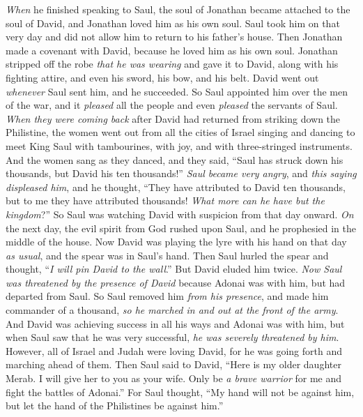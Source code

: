 \begin{biblechapter} %
 \textit{When} he finished speaking to Saul, the soul of Jonathan became attached to the soul of David, and Jonathan loved him as his own soul.
\verse Saul took him on that very day and did not allow him to return to his father’s house.
\verse Then Jonathan made a covenant with David, because he loved him as his own soul.
\verse Jonathan stripped off the robe \textit{that he was wearing} and gave it to David, along with his fighting attire, and even his sword, his bow, and his belt.
 David went out \textit{whenever} Saul sent him, and he succeeded. So Saul appointed him over the men of the war, and it \textit{pleased} all the people and even \textit{pleased} the servants of Saul.
\verse \textit{When they were coming back} after David had returned from striking down the Philistine, the women went out from all the cities of Israel singing and dancing to meet King Saul with tambourines, with joy, and with three-stringed instruments.
\verse And the women sang as they danced, and they said, “Saul has struck down his thousands, 
but David his ten thousands!”
\verse \textit{Saul became very angry}, and \textit{this saying displeased him}, and he thought, “They have attributed to David ten thousands, but to me they have attributed thousands! \textit{What more can he have but the kingdom}?”
\verse So Saul was watching David with suspicion from that day onward.
\verse \textit{On} the next day, the evil spirit from God rushed upon Saul, and he prophesied in the middle of the house. Now David was playing the lyre with his hand on that day \textit{as usual}, and the spear was in Saul’s hand.
\verse Then Saul hurled the spear and thought, “\textit{I will pin David to the wall}.” But David eluded him twice.
\verse \textit{Now Saul was threatened by the presence of David} because Adonai was with him, but had departed from Saul.
\verse So Saul removed him \textit{from his presence}, and made him commander of a thousand, \textit{so he marched in and out at the front of the army}.
\verse And David was achieving success in all his ways and Adonai was with him,
\verse but when Saul saw that he was very successful, \textit{he was severely threatened by him}.
\verse However, all of Israel and Judah were loving David, for he was going forth and marching ahead of them.
 Then Saul said to David, “Here is my older daughter Merab. I will give her to you as your wife. Only be \textit{a brave warrior} for me and fight the battles of Adonai.” For Saul thought, “My hand will not be against him, but let the hand of the Philistines be against him.”

\end{biblechapter}
